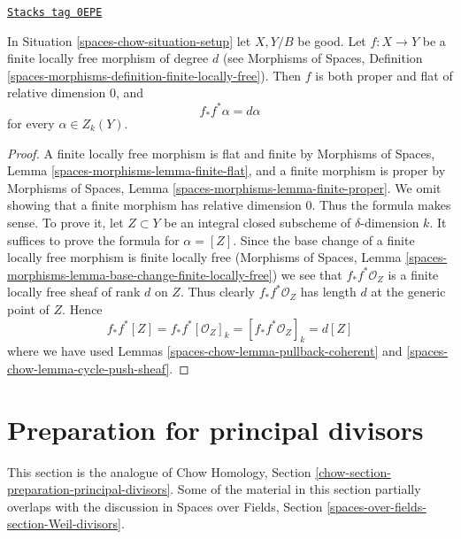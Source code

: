 \begin{lemma}
\label{spaces-chow-lemma-finite-flat}
\href{https://stacks.math.columbia.edu/tag/0EPE}{\texttt{Stacks tag 0EPE}}

In Situation \ref{spaces-chow-situation-setup} let $X, Y/B$ be good.
Let $f : X \to Y$ be a finite locally free morphism
of degree $d$ (see
Morphisms of Spaces, Definition
\ref{spaces-morphisms-definition-finite-locally-free}).
Then $f$ is both proper and flat of relative dimension $0$, and
$$
f_*f^*\alpha = d\alpha
$$
for every $\alpha \in Z_k(Y)$.
\end{lemma}

\begin{proof}
A finite locally free morphism is flat and finite by
Morphisms of Spaces, Lemma \ref{spaces-morphisms-lemma-finite-flat},
and a finite morphism is proper
by Morphisms of Spaces, Lemma \ref{spaces-morphisms-lemma-finite-proper}.
We omit showing that a finite
morphism has relative dimension $0$. Thus the formula makes sense.
To prove it, let $Z \subset Y$ be an integral closed subscheme
of $\delta$-dimension $k$. It suffices to prove the formula
for $\alpha = [Z]$. Since the base change of a finite locally free
morphism is finite locally free
(Morphisms of Spaces, Lemma
\ref{spaces-morphisms-lemma-base-change-finite-locally-free})
we see that $f_*f^*\mathcal{O}_Z$ is a finite locally free sheaf of
rank $d$ on $Z$. Thus clearly $f_*f^*\mathcal{O}_Z$ has length $d$
at the generic point of $Z$. Hence
$$
f_*f^*[Z] = f_*f^*[\mathcal{O}_Z]_k =
[f_*f^*\mathcal{O}_Z]_k = d[Z]
$$
where we have used Lemmas \ref{spaces-chow-lemma-pullback-coherent} and
\ref{spaces-chow-lemma-cycle-push-sheaf}.
\end{proof}

\section{Preparation for principal divisors}
\label{spaces-chow-section-preparation-principal-divisors}
This section is the analogue of
Chow Homology, Section \ref{chow-section-preparation-principal-divisors}.
Some of the material in this section partially overlaps with the
discussion in Spaces over Fields, Section
\ref{spaces-over-fields-section-Weil-divisors}.

